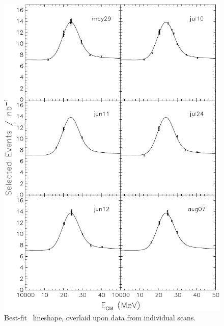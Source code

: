 \documentclass{cornell}
\begin{document}
\begin{figure}[p]
  \begin{center}
    \includegraphics[width=0.9\linewidth]{newnewplots/allscansss}
  \end{center}
  \caption[Best-fit lineshape for each \uss\ scan]{\label{allscansss} Best-fit \uss\ lineshape,
  overlaid upon data from individual scans.}
\end{figure}
\end{document}
